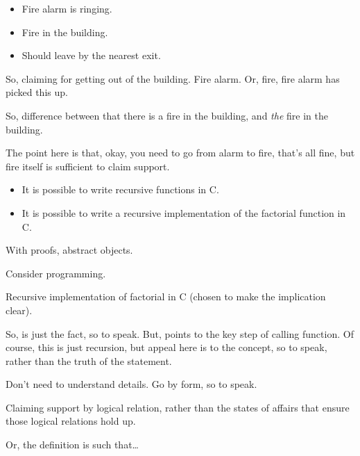 \begin{note}
  \begin{illustration}
    \mbox{}
    \vspace{-\baselineskip}
    \begin{itemize}
    \item Fire alarm is ringing.
    \item Fire in the building.
    \item Should leave by the nearest exit.
    \end{itemize}
  \end{illustration}
  So, claiming for getting out of the building.
  Fire alarm.
  Or, fire, fire alarm has picked this up.

  So, difference between that there is a fire in the building, and \emph{the} fire in the building.

  The point here is that, okay, you need to go from alarm to fire, that's all fine, but fire itself is sufficient to claim support.
\end{note}

\begin{note}

  \begin{illustration}\label{ill:ad:factorial}
    \mbox{}
    \vspace{-\baselineskip}
    \begin{itemize}
    \item It is possible to write recursive functions in C.
    \item It is possible to write a recursive implementation of the factorial function in C.
    \end{itemize}
  \end{illustration}
  With proofs, abstract objects.

  Consider programming.

  Recursive implementation of factorial in C (chosen to make the implication clear).

  So, \adA{} is just the fact, so to speak.
  But, \adB{} points to the key step of calling function.
  Of course, this is just recursion, but appeal here is to the concept, so to speak, rather than the truth of the statement.

  Don't need to understand details.
  Go by form, so to speak.

  Claiming support by logical relation, rather than the states of affairs that ensure those logical relations hold up.

  Or, the definition is such that\dots
\end{note}

